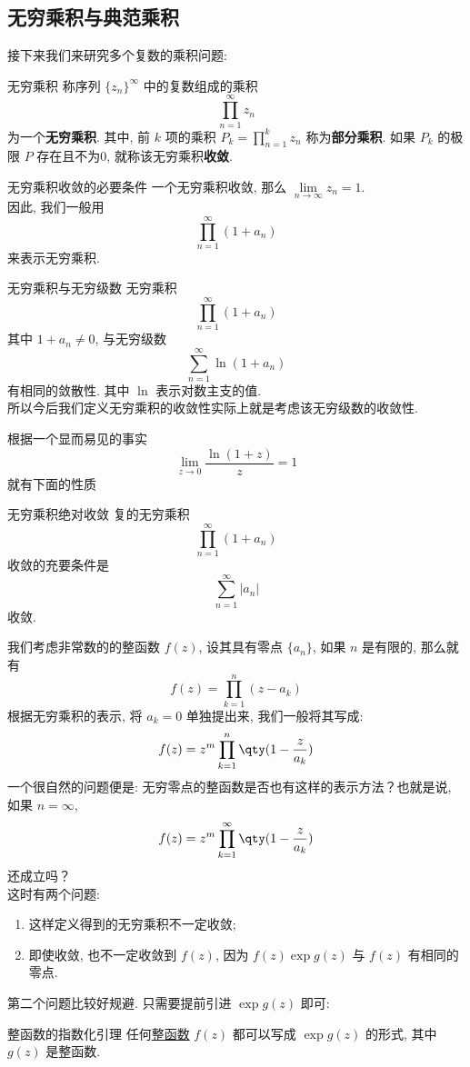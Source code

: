 \documentclass[UTF8]{ctexart}
\begin{document}
\subsection{无穷乘积与典范乘积}
接下来我们来研究多个复数的乘积问题: 
\begin{dfn}
    {无穷乘积}
    称序列 \( \{z_n\}^\infty \) 中的复数组成的乘积
    \[\prod_{n=1}^{\infty}z_n\]
    为一个\textbf{无穷乘积}. 其中, 前 \( k \) 项的乘积 \( P_k=\prod\limits_{n=1}^{k}z_n \) 称为\textbf{部分乘积}. 如果 \( P_k \) 的极限 \( P \) 存在且不为0, 就称该无穷乘积\textbf{收敛}. 
\end{dfn}
\begin{ppt}
    {无穷乘积收敛的必要条件}
    一个无穷乘积收敛, 那么 \( \lim\limits_{n\to\infty}z_n=1 \).\\
    因此, 我们一般用
    \[\prod_{n=1}^{\infty}(1+a_n)\]
    来表示无穷乘积. 
\end{ppt}
\begin{ppt}
    {无穷乘积与无穷级数}
    无穷乘积
    \[\prod_{n=1}^{\infty}(1+a_n)\]
    其中 \( 1+a_n\neq 0 \), 与无穷级数
    \[\sum_{n=1}^\infty\ln(1+a_n)\]
    有相同的敛散性. 其中 \( \ln \) 表示对数主支的值. \\
    所以今后我们定义无穷乘积的收敛性实际上就是考虑该无穷级数的收敛性. 
\end{ppt}
根据一个显而易见的事实
\[\lim_{z\to 0}\frac{\ln(1+z)}{z}=1\]
就有下面的性质
\begin{ppt}
    {无穷乘积绝对收敛}
    复的无穷乘积
    \[\prod_{n=1}^{\infty}(1+a_n)\]
    收敛的充要条件是
    \[\sum_{n=1}^\infty|a_n|\]
    收敛. 
\end{ppt}
我们考虑非常数的的整函数 \( f(z) \), 设其具有零点 \( \{a_n\} \), 如果 \( n \) 是有限的, 那么就有
\[f(z)=\prod_{k=1}^{n}(z-a_k)\]
根据无穷乘积的表示, 将 \( a_k=0 \) 单独提出来, 我们一般将其写成: 
\[f(z)=z^m\prod_{k=1}^{n}\qty(1-\frac{z}{a_k})\]
一个很自然的问题便是: 无穷零点的整函数是否也有这样的表示方法？也就是说, 如果 \( n=\infty \), 
\[f(z)=z^m\prod_{k=1}^{\infty}\qty(1-\frac{z}{a_k})\]
还成立吗？\\
这时有两个问题: \begin{enumerate}
    \item 这样定义得到的无穷乘积不一定收敛; 
    \item 即使收敛, 也不一定收敛到 \( f(z) \), 因为 \( f(z)\exp g(z) \) 与 \( f(z) \) 有相同的零点. 
\end{enumerate}
第二个问题比较好规避. 只需要提前引进 \( \exp g(z) \) 即可: 
\begin{lma}
    {整函数的指数化引理}
    任何\hyperref[dfn:EntireFunction]{整函数} \( f(z) \) 都可以写成 \( \exp g(z) \) 的形式, 其中 \( g(z) \) 是整函数.
\end{lma}
\end{document}
